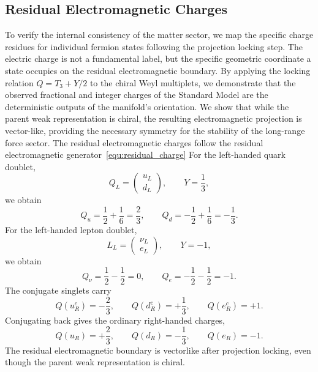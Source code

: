 \documentclass[11pt]{article}
\begin{document}
\subsection{Residual Electromagnetic Charges}
\label{sec:pr2_residual_em_charges_fermion_ledger}
To verify the internal consistency of the matter sector, we map the specific charge residues for individual fermion states following the projection locking step. The electric charge is not a fundamental label, but the specific geometric coordinate a state occupies on the residual electromagnetic boundary. By applying the locking relation $Q = T_3 + Y/2$ to the chiral Weyl multiplets, we demonstrate that the observed fractional and integer charges of the Standard Model are the deterministic outputs of the manifold's orientation. We show that while the parent weak representation is chiral, the resulting electromagnetic projection is vector-like, providing the necessary symmetry for the stability of the long-range force sector. The residual electromagnetic charges follow the residual electromagnetic generator~\ref{equ:residual_charge} For the left-handed quark doublet,
\begin{equation}
Q_L=
\begin{pmatrix}
u_L\\
d_L
\end{pmatrix},
\qquad
Y=\frac13,
\end{equation}
we obtain
\begin{equation}
\boxed{
Q_u
=
\frac12+\frac16
=
\frac23,
\qquad
Q_d
=
-\frac12+\frac16
=
-\frac13.
}
\end{equation}
For the left-handed lepton doublet,
\begin{equation}
L_L=
\begin{pmatrix}
\nu_L\\
e_L
\end{pmatrix},
\qquad
Y=-1,
\end{equation}
we obtain
\begin{equation}
\boxed{
Q_\nu
=
\frac12-\frac12
=
0,
\qquad
Q_e
=
-\frac12-\frac12
=
-1.
}
\end{equation}
The conjugate singlets carry
\begin{equation}
Q(u_R^c)=-\frac23,
\qquad
Q(d_R^c)=+\frac13,
\qquad
Q(e_R^c)=+1.
\end{equation}
Conjugating back gives the ordinary right-handed charges,
\begin{equation}
Q(u_R)=+\frac23,
\qquad
Q(d_R)=-\frac13,
\qquad
Q(e_R)=-1.
\end{equation}
The residual electromagnetic boundary is vectorlike after projection locking, even though the parent weak representation is chiral.
\end{document}
